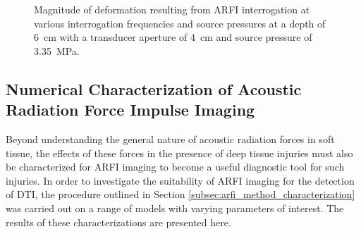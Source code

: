 			\begin{figure}[!htb]
				\centering
				\caption[ARFI-induced deformation across various interrogation frequencies and source pressures]{Magnitude of deformation resulting from ARFI interrogation at various interrogation frequencies and source pressures at a depth of \SI{6}{\cm} with a transducer aperture of \SI{4}{\cm} and source pressure of \SI{3.35}{\MPa}.}
				\label{fig:freq_pressure_maxDisp}
			\end{figure}

		\FloatBarrier
		\subsection{Numerical Characterization of Acoustic Radiation Force Impulse Imaging}
		\label{subsec:arfi_numerical_characterization}
			Beyond understanding the general nature of acoustic radiation forces in soft tissue, the effects of these forces in the presence of deep tissue injuries must also be characterized for ARFI imaging to become a useful diagnostic tool for such injuries. In order to investigate the suitability of ARFI imaging for the detection of DTI, the procedure outlined in Section \ref{subsec:arfi_method_characterization} was carried out on a range of models with varying parameters of interest. The results of these characterizations are presented here.

